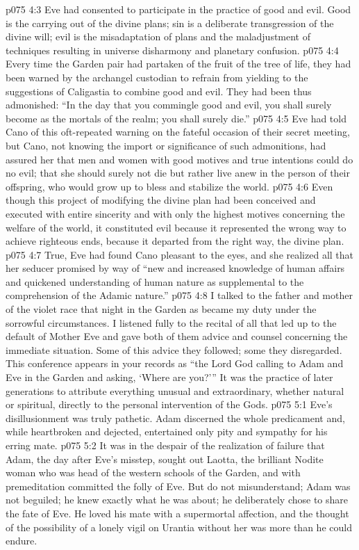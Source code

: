 \vs p075 4:3 Eve had consented to participate in the practice of good and evil. Good is the carrying out of the divine plans; sin is a deliberate transgression of the divine will; evil is the misadaptation of plans and the maladjustment of techniques resulting in universe disharmony and planetary confusion.
\vs p075 4:4 Every time the Garden pair had partaken of the fruit of the tree of life, they had been warned by the archangel custodian to refrain from yielding to the suggestions of Caligastia to combine good and evil. They had been thus admonished: “In the day that you commingle good and evil, you shall surely become as the mortals of the realm; you shall surely die.”
\vs p075 4:5 Eve had told Cano of this oft\hyp{}repeated warning on the fateful occasion of their secret meeting, but Cano, not knowing the import or significance of such admonitions, had assured her that men and women with good motives and true intentions could do no evil; that she should surely not die but rather live anew in the person of their offspring, who would grow up to bless and stabilize the world.
\vs p075 4:6 Even though this project of modifying the divine plan had been conceived and executed with entire sincerity and with only the highest motives concerning the welfare of the world, it constituted evil because it represented the wrong way to achieve righteous ends, because it departed from the right way, the divine plan.
\vs p075 4:7 True, Eve had found Cano pleasant to the eyes, and she realized all that her seducer promised by way of “new and increased knowledge of human affairs and quickened understanding of human nature as supplemental to the comprehension of the Adamic nature.”
\vs p075 4:8 I talked to the father and mother of the violet race that night in the Garden as became my duty under the sorrowful circumstances. I listened fully to the recital of all that led up to the default of Mother Eve and gave both of them advice and counsel concerning the immediate situation. Some of this advice they followed; some they disregarded. This conference appears in your records as “the Lord God calling to Adam and Eve in the Garden and asking, ‘Where are you?’” It was the practice of later generations to attribute everything unusual and extraordinary, whether natural or spiritual, directly to the personal intervention of the Gods.
\vs p075 5:1 Eve’s disillusionment was truly pathetic. Adam discerned the whole predicament and, while heartbroken and dejected, entertained only pity and sympathy for his erring mate.
\vs p075 5:2 It was in the despair of the realization of failure that Adam, the day after Eve’s misstep, sought out Laotta, the brilliant Nodite woman who was head of the western schools of the Garden, and with premeditation committed the folly of Eve. But do not misunderstand; Adam was not beguiled; he knew exactly what he was about; he deliberately chose to share the fate of Eve. He loved his mate with a supermortal affection, and the thought of the possibility of a lonely vigil on Urantia without her was more than he could endure.
